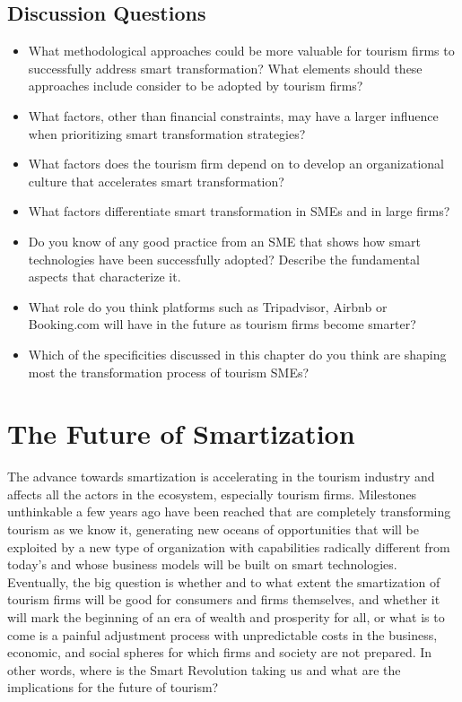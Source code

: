 \documentclass[
  letterpaper,
  DIV=11,
  numbers=noendperiod]{scrreprt}
\begin{document}
\hypertarget{discussion-questions-17}{%
\section{Discussion Questions}\label{discussion-questions-17}}

\begin{itemize}
\item
  What methodological approaches could be more valuable for tourism
  firms to successfully address smart transformation? What elements
  should these approaches include consider to be adopted by tourism
  firms?
\item
  What factors, other than financial constraints, may have a larger
  influence when prioritizing smart transformation strategies?
\item
  What factors does the tourism firm depend on to develop an
  organizational culture that accelerates smart transformation?
\item
  What factors differentiate smart transformation in SMEs and in large
  firms?
\item
  Do you know of any good practice from an SME that shows how smart
  technologies have been successfully adopted? Describe the fundamental
  aspects that characterize it.
\item
  What role do you think platforms such as Tripadvisor, Airbnb or
  Booking.com will have in the future as tourism firms become smarter?
\item
  Which of the specificities discussed in this chapter do you think are
  shaping most the transformation process of tourism SMEs?
\end{itemize}

\hypertarget{the-future-of-smartization}{%
\chapter{The Future of Smartization}\label{the-future-of-smartization}}

The advance towards smartization is accelerating in the tourism industry
and affects all the actors in the ecosystem, especially tourism firms.
Milestones unthinkable a few years ago have been reached that are
completely transforming tourism as we know it, generating new oceans of
opportunities that will be exploited by a new type of organization with
capabilities radically different from today's and whose business models
will be built on smart technologies. Eventually, the big question is
whether and to what extent the smartization of tourism firms will be
good for consumers and firms themselves, and whether it will mark the
beginning of an era of wealth and prosperity for all, or what is to come
is a painful adjustment process with unpredictable costs in the
business, economic, and social spheres for which firms and society are
not prepared. In other words, where is the Smart Revolution taking us
and what are the implications for the future of tourism?
\end{document}
